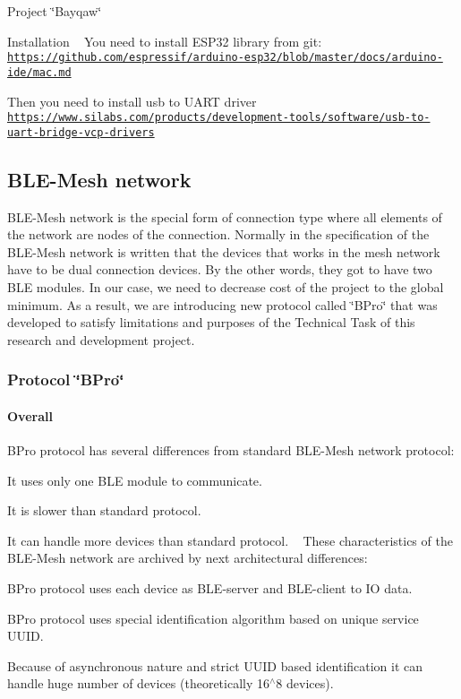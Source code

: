 Project \char`\"{}\+Bayqaw\char`\"{}

Installation ~\newline
You need to install E\+S\+P32 library from git\+: \href{https://github.com/espressif/arduino-esp32/blob/master/docs/arduino-ide/mac.md}{\tt https\+://github.\+com/espressif/arduino-\/esp32/blob/master/docs/arduino-\/ide/mac.\+md}

Then you need to install usb to U\+A\+RT driver ~\newline
\href{https://www.silabs.com/products/development-tools/software/usb-to-uart-bridge-vcp-drivers}{\tt https\+://www.\+silabs.\+com/products/development-\/tools/software/usb-\/to-\/uart-\/bridge-\/vcp-\/drivers}

\subsection*{B\+L\+E-\/\+Mesh network}

B\+L\+E-\/\+Mesh network is the special form of connection type where all elements of the network are nodes of the connection. Normally in the specification of the B\+L\+E-\/\+Mesh network is written that the devices that works in the mesh network have to be dual connection devices. By the other words, they got to have two B\+LE modules. In our case, we need to decrease cost of the project to the global minimum. As a result, we are introducing new protocol called \char`\"{}\+B\+Pro\char`\"{} that was developed to satisfy limitations and purposes of the Technical Task of this research and development project. \subsubsection*{Protocol \char`\"{}\+B\+Pro\char`\"{}}

\paragraph*{Overall}

B\+Pro protocol has several differences from standard B\+L\+E-\/\+Mesh network protocol\+:
\begin{DoxyItemize}
\item It uses only one B\+LE module to communicate.
\item It is slower than standard protocol.
\item It can handle more devices than standard protocol. ~\newline
 These characteristics of the B\+L\+E-\/\+Mesh network are archived by next architectural differences\+:
\item B\+Pro protocol uses each device as B\+L\+E-\/server and B\+L\+E-\/client to IO data.
\item B\+Pro protocol uses special identification algorithm based on unique service U\+U\+ID.
\item Because of asynchronous nature and strict U\+U\+ID based identification it can handle huge number of devices (theoretically 16$^\wedge$8 devices).
\end{DoxyItemize}

